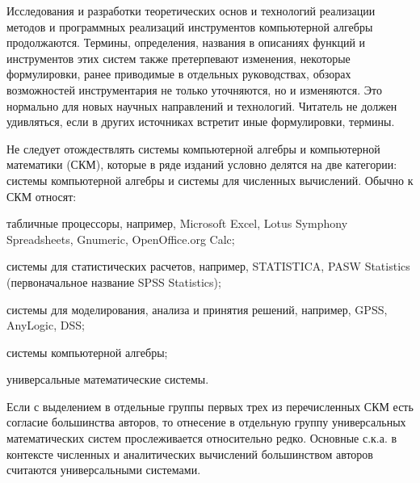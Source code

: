 Исследования и разработки теоретических основ и технологий реализации методов и программных реализаций инструментов компьютерной алгебры продолжаются. Термины, определения, названия в описаниях функций и инструментов этих систем также претерпевают изменения, некоторые формулировки, ранее приводимые в отдельных руководствах, обзорах возможностей инструментария не только уточняются, но и изменяются. Это нормально для новых научных направлений и технологий. Читатель не должен удивляться, если в других источниках встретит иные формулировки, термины.

Не следует отождествлять системы компьютерной алгебры и компьютерной математики (СКМ), которые в ряде изданий условно делятся на две категории: системы компьютерной алгебры и системы для численных вычислений. Обычно к СКМ относят:
\begin{textitemize}
	\item табличные процессоры, например, Microsoft Excel, Lotus Symphony Spreadsheets, Gnumeric, OpenOffice.org Calc;
	\item системы для статистических расчетов, например, STATISTICA, PASW Statistics (первоначальное название SPSS Statistics);
	\item системы для моделирования, анализа и принятия решений, например, GPSS, AnyLogic, DSS;
	\item системы компьютерной алгебры;
	\item универсальные математические системы.
\end{textitemize}

Если с выделением в отдельные группы первых трех из перечисленных СКМ есть согласие большинства авторов, то отнесение в отдельную группу универсальных математических систем прослеживается относительно редко. Основные с.к.а. в контексте численных и аналитических вычислений большинством авторов считаются универсальными системами.

